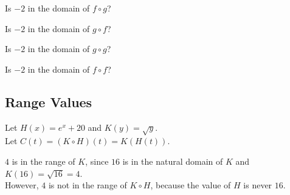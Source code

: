 \documentclass{ximera}
\begin{document}
\begin{question}

Is $-2$ in the domain of $f \circ g$?

\begin{multipleChoice}
\end{multipleChoice}


Is $-2$ in the domain of $g \circ f$?

\begin{multipleChoice}
\end{multipleChoice}



Is $-2$ in the domain of $g \circ g$?

\begin{multipleChoice}
\end{multipleChoice}


Is $-2$ in the domain of $f \circ f$?

\begin{multipleChoice}
\end{multipleChoice}




\end{question}




\subsection*{Range Values}



Let $H(x) = e^x + 20$ and $K(y) = \sqrt{y}$. \\

Let $C(t) = (K \circ H)(t) = K(H(t))$. \\



\begin{explanation}


$4$ is in the range of $K$, since $16$ is in the natural domain of $K$ and $K(16) = \sqrt{16} = 4$. \\

However, $4$ is not in the range of $K \circ H$, because the value of $H$ is never $16$. 


\end{explanation}
\end{document}
